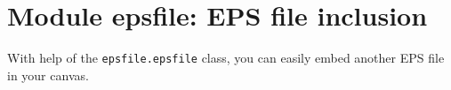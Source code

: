 \chapter{Module epsfile: EPS file inclusion}

With help of the \verb|epsfile.epsfile| class, you can easily embed
another EPS file in your canvas.

\label{epsfile}


